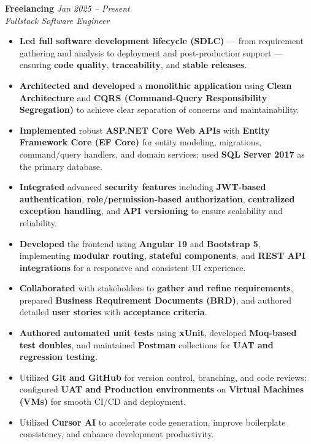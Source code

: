 \documentclass[12pt,a4paper]{article}
\begin{document}
\textbf{Freelancing} \hfill \textit{Jan 2025 -- Present}\\
\textit{Fullstack Software Engineer}
\begin{itemize}
    \item \textbf{Led full software development lifecycle (SDLC)} — from requirement gathering and analysis to deployment and post-production support — ensuring \textbf{code quality}, \textbf{traceability}, and \textbf{stable releases}.
    \item \textbf{Architected and developed} a \textbf{monolithic application} using \textbf{Clean Architecture} and \textbf{CQRS (Command-Query Responsibility Segregation)} to achieve clear separation of concerns and maintainability.
    \item \textbf{Implemented} robust \textbf{ASP.NET Core Web APIs} with \textbf{Entity Framework Core (EF Core)} for entity modeling, migrations, command/query handlers, and domain services; used \textbf{SQL Server 2017} as the primary database.
    \item \textbf{Integrated} advanced \textbf{security features} including \textbf{JWT-based authentication}, \textbf{role/permission-based authorization}, \textbf{centralized exception handling}, and \textbf{API versioning} to ensure scalability and reliability.
    \item \textbf{Developed} the frontend using \textbf{Angular 19} and \textbf{Bootstrap 5}, implementing \textbf{modular routing}, \textbf{stateful components}, and \textbf{REST API integrations} for a responsive and consistent UI experience.
    \item \textbf{Collaborated} with stakeholders to \textbf{gather and refine requirements}, prepared \textbf{Business Requirement Documents (BRD)}, and authored detailed \textbf{user stories} with \textbf{acceptance criteria}.
    \item \textbf{Authored automated unit tests} using \textbf{xUnit}, developed \textbf{Moq-based test doubles}, and maintained \textbf{Postman} collections for \textbf{UAT and regression testing}.
    \item Utilized\textbf{ Git and GitHub} for version control, branching, and code reviews; configured \textbf{UAT and Production environments} on \textbf{Virtual Machines (VMs)} for smooth CI/CD and deployment.
    \item Utilized \textbf{Cursor AI} to accelerate code generation, improve boilerplate consistency, and enhance development productivity.
\end{itemize}
\end{document}
